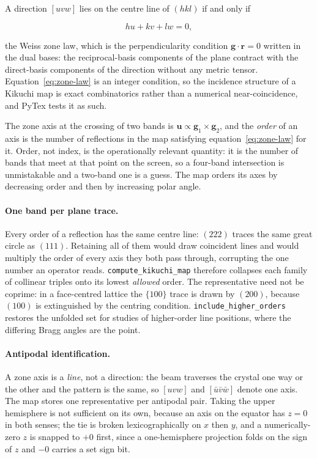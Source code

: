 A direction $[uvw]$ lies on the centre line of $(hkl)$ if and only if

\begin{equation}
  hu + kv + lw = 0,
  \label{eq:zone-law}
\end{equation}

the Weiss zone law, which is the perpendicularity condition
$\mathbf{g}\cdot\mathbf{r} = 0$ written in the dual bases: the reciprocal-basis
components of the plane contract with the direct-basis components of the direction
without any metric tensor. Equation~\eqref{eq:zone-law} is an integer condition,
so the incidence structure of a Kikuchi map is exact combinatorics rather than a
numerical near-coincidence, and PyTex tests it as such.

The zone axis at the crossing of two bands is
$\mathbf{u} \propto \mathbf{g}_1 \times \mathbf{g}_2$, and the \emph{order} of an
axis is the number of reflections in the map satisfying
equation~\eqref{eq:zone-law} for it. Order, not index, is the operationally
relevant quantity: it is the number of bands that meet at that point on the
screen, so a four-band intersection is unmistakable and a two-band one is a guess.
The map orders its axes by decreasing order and then by increasing polar angle.

\paragraph{One band per plane trace.}
Every order of a reflection has the same centre line: $(222)$ traces the same
great circle as $(111)$. Retaining all of them would draw coincident lines and
would multiply the order of every axis they both pass through, corrupting the one
number an operator reads. \texttt{compute\_kikuchi\_map} therefore collapses each
family of collinear triples onto its lowest \emph{allowed} order. The
representative need not be coprime: in a face-centred lattice the $\{100\}$ trace
is drawn by $(200)$, because $(100)$ is extinguished by the centring condition.
\texttt{include\_higher\_orders} restores the unfolded set for studies of
higher-order line positions, where the differing Bragg angles are the point.

\paragraph{Antipodal identification.}
A zone axis is a \emph{line}, not a direction: the beam traverses the crystal one
way or the other and the pattern is the same, so $[uvw]$ and
$[\bar{u}\bar{v}\bar{w}]$ denote one axis. The map stores one representative per
antipodal pair. Taking the upper hemisphere is not sufficient on its own, because
an axis on the equator has $z = 0$ in both senses; the tie is broken
lexicographically on $x$ then $y$, and a numerically-zero $z$ is snapped to $+0$
first, since a one-hemisphere projection folds on the sign of $z$ and $-0$ carries
a set sign bit.

